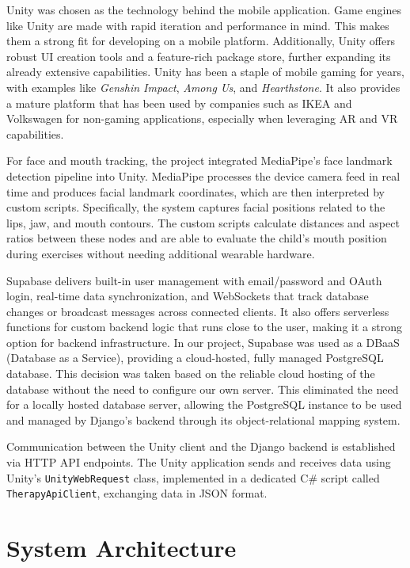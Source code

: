 Unity was chosen as the technology behind the mobile application. Game engines like Unity are made with rapid iteration and performance in mind. This makes them a strong fit for developing on a mobile platform. Additionally, Unity offers robust UI creation tools and a feature-rich package store, further expanding its already extensive capabilities. Unity has been a staple of mobile gaming for years, with examples like \textit{Genshin Impact}, \textit{Among Us}, and \textit{Hearthstone}. It also provides a mature platform that has been used by companies such as IKEA and Volkswagen for non-gaming applications, especially when leveraging AR and VR capabilities.

For face and mouth tracking, the project integrated MediaPipe's face landmark detection pipeline into Unity. MediaPipe processes the device camera feed in real time and produces facial landmark coordinates, which are then interpreted by custom scripts. Specifically, the system captures facial positions related to the lips, jaw, and mouth contours. The custom scripts calculate distances and aspect ratios between these nodes and are able to evaluate the child's mouth position during exercises without needing additional wearable hardware.

Supabase delivers built-in user management with email/password and OAuth login, real-time data synchronization, and WebSockets that track database changes or broadcast messages across connected clients. It also offers serverless functions for custom backend logic that runs close to the user, making it a strong option for backend infrastructure. In our project, Supabase was used as a DBaaS (Database as a Service), providing a cloud-hosted, fully managed PostgreSQL database. This decision was taken based on the reliable cloud hosting of the database without the need to configure our own server. This eliminated the need for a locally hosted database server, allowing the PostgreSQL instance to be used and managed by Django's backend through its object-relational mapping system.

Communication between the Unity client and the Django backend is established via HTTP API endpoints. The Unity application sends and receives data using Unity's \texttt{UnityWebRequest} class, implemented in a dedicated C\# script called \texttt{TherapyApiClient}, exchanging data in JSON format.

\section{System Architecture}
\label{sec:system-architecture}

